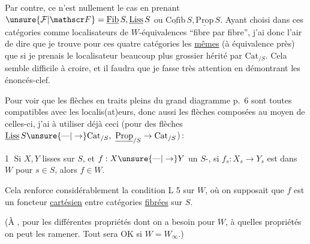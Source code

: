 
Par contre, ce n'est nullement le cas en prenant $\unsure{\mathcal F|\mathscr F}=\underline{\mathrm{Fib}}\,S,\underline{\mathrm{Liss}}\,S$ ou $\underline{\mathrm{Cofib}}\,S,\underline{\mathrm{Prop}}\,S$. Ayant choisi dans ces catégories comme localisateurs  de $W$-équivalences ``fibre par fibre'', j'ai donc l'air de dire que je trouve pour ces quatre catégories les \uline{mêmes}  (à équivalence près) que si je prenais le localisateur beaucoup plus grossier hérité par $\mathrm{Cat}_{/S}$. Cela semble difficile à croire, et il faudra que je fasse très attention en démontrant les énoncés-clef.

Pour voir que les flèches en traits pleins du grand diagramme p.~6 sont toutes compatibles avec les localis(at)eurs, donc aussi les flèches composées au moyen de celles-ci, j'ai à utiliser déjà ceci (pour  des flèches $\underline{\mathrm{Liss}}\,S\unsure{\text{---}|\to}\mathrm{Cat}_{/S},\ \underline{\mathrm{Prop}}_{/S}\to\mathrm{Cat}_{/S}$)\,:

\textcircled{1} Si $X,Y$ lisses  sur $S$, et $f:X\unsure{\text{---}|\to}Y$ un $S$-, si $f_s:X_s\to Y_s$ est dans $W$ pour  $s\in S$, alors $f\in W$.

Cela renforce considérablement la condition L 5 sur $W$, où on supposait  que $f$ est un foncteur \uline{cartésien} entre catégories \uline{fibrées} sur $S$.

(À , pour les différentes propriétés dont on a besoin\unsure{$\ne$|,} pour $W$, à quelles propriétés  on peut les ramener. Tout sera OK si $W=W_\infty$.)


